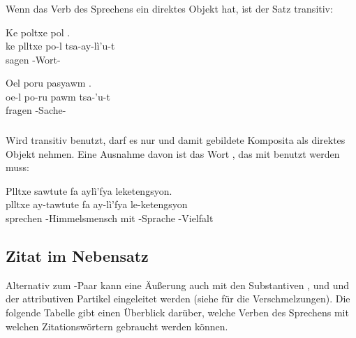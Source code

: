 \subsubsection{} Wenn das Verb des Sprechens ein direktes Objekt hat, ist der Satz transitiv:

\begin{interlin}
	\glll \Npawl{}Ke poltxe pol . \\
	ke plltxe po-l tsa-ay-lì'u-t \\
	 sagen  -Wort- \\
\end{interlin}

\begin{interlin}
	\glll \Npawl{}Oel poru pasyawm . \\
	oe-l po-ru pawm tsa-'u-t \\
	  fragen -Sache- \\
\end{interlin}

\subsubsection{} Wird  transitiv benutzt, darf es nur  und damit gebildete Komposita als direktes Objekt nehmen. Eine Ausnahme davon ist das Wort , das mit  benutzt werden muss:

\begin{interlin}
	\glll \Npawl{}Plltxe sawtute fa aylì'fya leketengsyon. \\
	plltxe ay-tawtute fa ay-lì'fya le-ketengsyon \\
	sprechen -Himmelsmensch mit -Sprache -Vielfalt \\
\end{interlin}

\subsection{Zitat im Nebensatz} Alternativ zum -Paar kann eine Äußerung auch mit den Substantiven  ,   und   und der attributiven Partikel  eingeleitet werden (siehe  für die Verschmelzungen). Die folgende Tabelle gibt einen Überblick darüber, welche Verben des Sprechens mit welchen Zitationswörtern gebraucht werden können. \\

